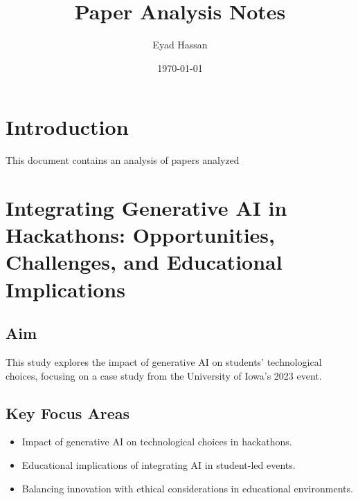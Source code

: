 \documentclass{article}
\title{Paper Analysis Notes}
\author{Eyad Hassan}
\date{\today}
\begin{document}
\maketitle

\section{Introduction}
This document contains an analysis of papers analyzed

\newpage


\newpage


\newpage


\newpage


\newpage


\newpage


\newpage


\newpage


\newpage


\newpage
\section{Integrating Generative AI in Hackathons: Opportunities, Challenges, and Educational Implications}

\subsection{Aim}
This study explores the impact of generative AI on students' technological choices, focusing on a case study from the University of Iowa's 2023 event.

\subsection{Key Focus Areas}
\begin{itemize}
    \item Impact of generative AI on technological choices in hackathons.
    \item Educational implications of integrating AI in student-led events.
    \item Balancing innovation with ethical considerations in educational environments.
\end{itemize}
\end{document}
